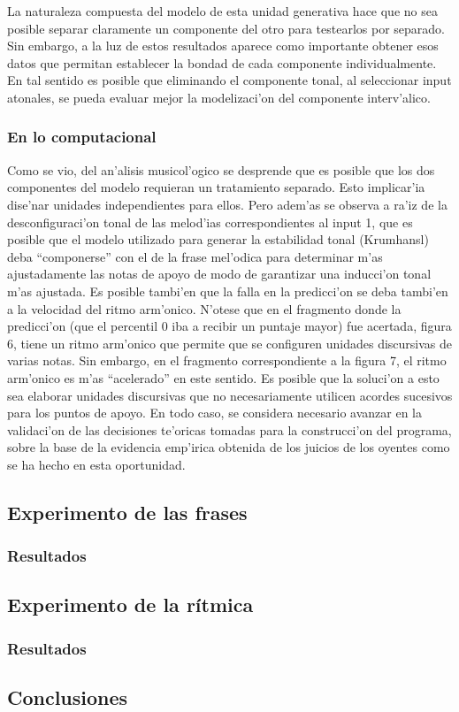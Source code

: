 La naturaleza compuesta del modelo de esta unidad generativa hace que no sea posible separar claramente un componente del otro para testearlos por separado. 
Sin embargo, a la luz de estos resultados aparece como importante obtener esos datos que permitan establecer la bondad de cada componente individualmente. En tal 
sentido es posible que eliminando el componente tonal, al seleccionar input atonales, se pueda evaluar mejor la modelizaci'on del componente interv'alico.


\subsubsection{En lo computacional}
Como se vio, del an'alisis musicol'ogico se desprende que es posible que los dos componentes del modelo requieran un tratamiento separado. Esto implicar'ia dise'nar unidades independientes para ellos. 
Pero adem'as se observa a ra'iz de la desconfiguraci'on tonal de las melod'ias correspondientes al input 1, que es posible que el modelo utilizado para generar la estabilidad tonal (Krumhansl) deba ``componerse'' con el de la frase mel'odica para determinar m'as ajustadamente las notas de apoyo de modo de garantizar una inducci'on tonal m'as ajustada. 
Es posible tambi'en que la falla en la predicci'on se deba tambi'en a la velocidad del ritmo arm'onico. N'otese que en el fragmento donde la predicci'on (que el percentil 0 iba a recibir un puntaje mayor) fue acertada, figura 6, tiene un ritmo arm'onico que permite que se configuren unidades discursivas de varias notas. Sin embargo, en el fragmento correspondiente a la figura 7, el ritmo arm'onico es m'as ``acelerado'' en este sentido. Es posible que la soluci'on a esto sea elaborar unidades discursivas que no necesariamente utilicen acordes sucesivos para los puntos de apoyo.
En todo caso, se considera necesario avanzar en la validaci'on de las decisiones te'oricas tomadas para la construcci'on del programa, sobre la base de la evidencia emp'irica obtenida de los juicios de los oyentes como se ha hecho en esta oportunidad.




\subsection{Experimento de las frases}
\label{sec:exp_frase}
\subsubsection{Resultados}

\subsection{Experimento de la r\'itmica}
\label{sec:exp_ritmica}
\subsubsection{Resultados}

\subsection{Conclusiones}


